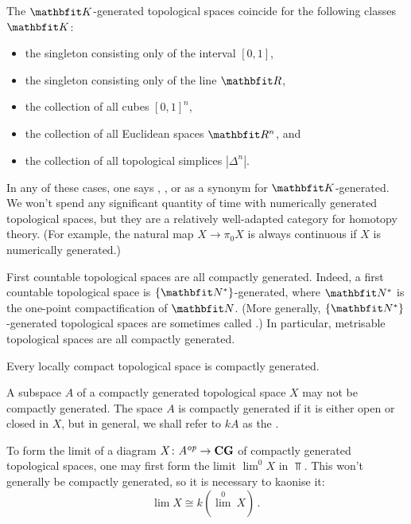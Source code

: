 \begin{exm}
	The $ \KK $-generated topological spaces coincide for the following classes $ \KK $:
	\begin{itemize}
		\item the singleton consisting only of the interval $ [0,1] $,
		\item the singleton consisting only of the line $ \RR $,
		\item the collection of all cubes $ [0, 1]^n $,
		\item the collection of all Euclidean spaces $ \RR^n $, and
		\item the collection of all topological simplices $ |\Delta^n| $.
	\end{itemize}
	In any of these cases, one says , , or  as a synonym for $ \KK $-generated.
	We won't spend any significant quantity of time with numerically generated topological spaces, but they are a relatively well-adapted category for homotopy theory.
	(For example, the natural map $ X \to \pi_0 X $ is always continuous if $ X $ is numerically generated.)
\end{exm}

\begin{exm}
	First countable topological spaces are all compactly generated.
	Indeed, a first countable topological space is $ \{ \NN^{\ast} \} $-generated, where $ \NN^{\ast} $ is the one-point compactification of $ \NN $.
	(More generally, $\{ \NN^{\ast} \}$-generated topological spaces are sometimes called .)
	In particular, metrisable topological spaces are all compactly generated.
\end{exm}

\begin{exm}
	Every locally compact topological space is compactly generated.
\end{exm}

\begin{wrn}
	A subspace $ A $ of a compactly generated topological space $ X $ may not be compactly generated.
	The space $ A $ is compactly generated if it is either open or closed in $ X $, but in general, we shall refer to $ kA $ as the .
\end{wrn}

\begin{cnstr}
	To form the limit of a diagram $ X \colon A^{\textit{op}} \to \textbf{\textup{CG}} $ of compactly generated topological spaces, one may first form the limit $ \lim^0 X $ in $ \Top $.
	This won't generally be compactly generated, so it is necessary to kaonise it:
	\[
		\lim X \cong k({\lim}^0\ X) \period
	\]
\end{cnstr}

